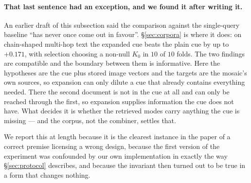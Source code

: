 \paragraph{That last sentence had an exception, and we found it after writing it.} An
earlier draft of this subsection said the comparison against the single-query baseline
``has never once come out in favour''. \S\ref{sec:corpora} is where it does: on
chain-shaped multi-hop text the expanded cue beats the plain cue by up to $+0.171$, with
selection choosing a non-null $K_0$ in $10$ of $10$ folds. The two findings are compatible
and the boundary between them is informative. Here the hypotheses are the cue plus stored
image vectors and the targets are the mosaic's own sources, so expansion can only dilute a
cue that already contains everything needed. There the second document is not in the cue at
all and can only be reached through the first, so expansion supplies information the cue
does not have. What decides it is whether the retrieved modes carry anything the cue is
missing --- and the corpus, not the combiner, settles that.

We report this at length because it is the clearest instance in the paper of a correct
premise licensing a wrong design, because the first version of the experiment was
confounded by our own implementation in exactly the way \S\ref{sec:protocol} describes, and
because the invariant then turned out to be true in a form that changes nothing.
